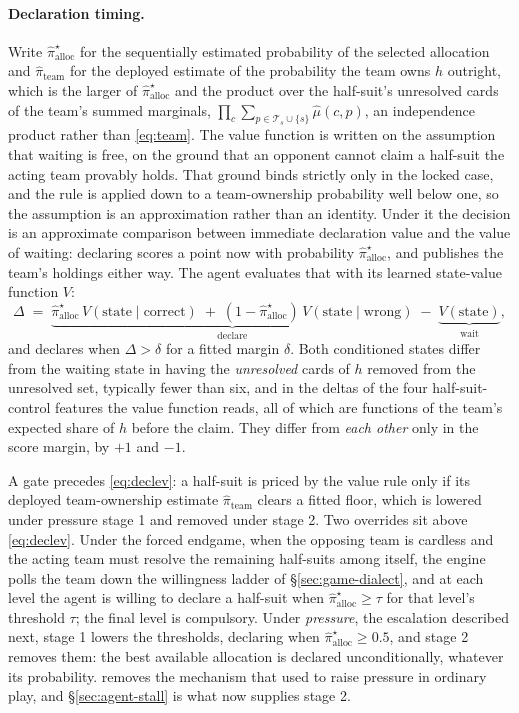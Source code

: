 \paragraph{Declaration timing.} Write $\hat\pi_{\mathrm{alloc}}^\star$ for the sequentially
estimated probability of the selected allocation and $\hat\pi_{\mathrm{team}}$ for the deployed
estimate of the probability the team owns $h$ outright, which is the larger of
$\hat\pi_{\mathrm{alloc}}^\star$ and the product over the half-suit's unresolved cards of the team's
summed marginals, $\prod_{c}\sum_{p \in \mathcal{T}_s \cup \{s\}}\hat\mu(c,p)$, an independence
product rather than \eqref{eq:team}. The value function is written on the
assumption that waiting is free, on the ground that an opponent cannot claim a half-suit the acting
team provably holds. That ground binds strictly only in the locked case, and the rule is applied
down to a team-ownership probability well below one, so the assumption is an approximation rather
than an identity. Under it the decision is an approximate comparison between immediate declaration
value and the value of waiting: declaring scores a point now with probability
$\hat\pi_{\mathrm{alloc}}^\star$, and publishes the team's holdings either way. The agent evaluates
that with its learned state-value function $V$:
\begin{equation}
  \Delta \;=\; \underbrace{\hat\pi_{\mathrm{alloc}}^\star\, V(\text{state} \mid \text{correct})
  \;+\; (1-\hat\pi_{\mathrm{alloc}}^\star)\, V(\text{state} \mid \text{wrong})}_{\text{declare}}
  \;-\; \underbrace{V(\text{state})}_{\text{wait}},
  \label{eq:declev}
\end{equation}
and declares when $\Delta > \delta$ for a fitted margin $\delta$. Both conditioned states differ from the waiting state in having the \emph{unresolved} cards of $h$
removed from the unresolved set, typically fewer than six, and in the deltas of the four
half-suit-control features the value function reads, all of which are functions of the team's
expected share of $h$ before the claim. They differ from \emph{each other} only in the score margin,
by $+1$ and $-1$.

A gate precedes \eqref{eq:declev}: a half-suit is priced by the value rule only if its deployed
team-ownership estimate $\hat\pi_{\mathrm{team}}$ clears a fitted floor, which is lowered under
pressure stage 1 and removed under stage 2. Two overrides sit above \eqref{eq:declev}. Under the
forced endgame, when the opposing team is cardless and the acting team must resolve the remaining
half-suits among itself, the engine polls the team down the willingness ladder of
\S\ref{sec:game-dialect}, and at each level the agent is willing to declare a half-suit when
$\hat\pi_{\mathrm{alloc}}^\star \ge \tau$ for that level's threshold $\tau$; the final level is
compulsory. Under \emph{pressure}, the escalation described next, stage 1 lowers the thresholds,
declaring when $\hat\pi_{\mathrm{alloc}}^\star \ge 0.5$, and stage 2 removes them: the best
available allocation is declared unconditionally, whatever its probability.
\sestina{} removes the mechanism that used to raise pressure in ordinary play, and
\S\ref{sec:agent-stall} is what now supplies stage 2.

